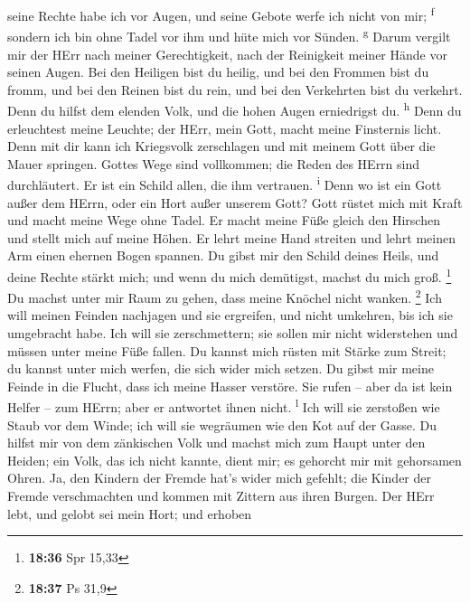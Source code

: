 seine Rechte habe ich vor Augen, und seine Gebote werfe ich nicht von
mir; \textsuperscript{f}  sondern ich bin ohne Tadel vor
ihm und hüte mich vor Sünden. \textsuperscript{g}  Darum
vergilt mir der HErr nach meiner Gerechtigkeit, nach der Reinigkeit
meiner Hände vor seinen Augen.  Bei den Heiligen bist du
heilig, und bei den Frommen bist du fromm,  und bei den
Reinen bist du rein, und bei den Verkehrten bist du verkehrt.
 Denn du hilfst dem elenden Volk, und die hohen Augen
erniedrigst du. \textsuperscript{h}  Denn du erleuchtest
meine Leuchte; der HErr, mein Gott, macht meine Finsternis licht.
 Denn mit dir kann ich Kriegsvolk zerschlagen und mit
meinem Gott über die Mauer springen.  Gottes Wege sind
vollkommen; die Reden des HErrn sind durchläutert. Er ist ein Schild
allen, die ihm vertrauen. \textsuperscript{i}  Denn wo
ist ein Gott außer dem HErrn, oder ein Hort außer unserem Gott?
 Gott rüstet mich mit Kraft und macht meine Wege ohne
Tadel.  Er macht meine Füße gleich den Hirschen und
stellt mich auf meine Höhen.  Er lehrt meine Hand
streiten und lehrt meinen Arm einen ehernen Bogen spannen.
 Du gibst mir den Schild deines Heils, und deine Rechte
stärkt mich; und wenn du mich demütigst, machst du mich groß.
\footnote{\textbf{18:36} Spr 15,33}  Du machst unter mir
Raum zu gehen, dass meine Knöchel nicht wanken. \footnote{\textbf{18:37}
  Ps 31,9}  Ich will meinen Feinden nachjagen und sie
ergreifen, und nicht umkehren, bis ich sie umgebracht habe.
 Ich will sie zerschmettern; sie sollen mir nicht
widerstehen und müssen unter meine Füße fallen.  Du
kannst mich rüsten mit Stärke zum Streit; du kannst unter mich werfen,
die sich wider mich setzen.  Du gibst mir meine Feinde in
die Flucht, dass ich meine Hasser verstöre.  Sie rufen --
aber da ist kein Helfer -- zum HErrn; aber er antwortet ihnen nicht.
\textsuperscript{l}  Ich will sie zerstoßen wie Staub vor
dem Winde; ich will sie wegräumen wie den Kot auf der Gasse.
 Du hilfst mir von dem zänkischen Volk und machst mich
zum Haupt unter den Heiden; ein Volk, das ich nicht kannte, dient mir;
 es gehorcht mir mit gehorsamen Ohren. Ja, den Kindern
der Fremde hat's wider mich gefehlt;  die Kinder der
Fremde verschmachten und kommen mit Zittern aus ihren Burgen.
 Der HErr lebt, und gelobt sei mein Hort; und erhoben
